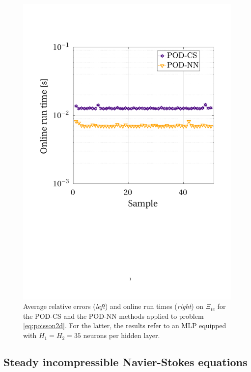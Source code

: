 \documentclass[longtitle]{elsarticle}
\numberwithin{equation}{section}
\theoremstyle{theorem}
\theoremstyle{definition}
\theoremstyle{remark}
\theoremstyle{proposition}
\numberwithin{figure}{section}
\begin{document}
\begin{figure}[t!]
			\includegraphics[scale = 0.372, trim = {1.5cm 8.9cm 1.5cm 3.8cm}, clip]{poisson2d_3_cs_time}
			
			\vspace*{-0.2cm}
			
			\caption{Average relative errors (\emph{left}) and online run times (\emph{right}) on $\Xi_{te}$ for the POD-CS and the POD-NN methods applied to problem \eqref{eq:poisson2d}. For the latter, the results refer to an MLP equipped with $H_1 = H_2 = 35$ neurons per hidden layer.}
			\label{fig:poisson2d-fig5}
		\end{figure}
		
		
		
	\subsection{Steady incompressible Navier-Stokes equations}
	\label{section:Steady incompressible Navier-Stokes equations}
	
\end{document}
